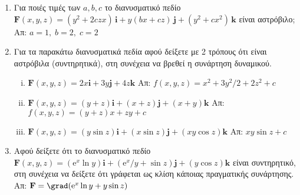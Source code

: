 




\pagestyle{askhseis}
\everymath{\displaystyle}



\begin{center}
  \minibox{\large\bfseries \textcolor{Col1}{Επικαμπύλιο Ολοκλήρωμα ΙΙου είδους}}
\end{center}

\vspace{\baselineskip}

\begin{enumerate}


  \section*{Ανεξαρτησία Διαδρομής}

  \item Για ποιές τιμές των $ a,b,c $ το διανυσματικό πεδίο $ \mathbf{F}(x,y,z) =
    (y^{2}+2czx)
    \,\mathbf{i} + y(bx+cz) \,\mathbf{j} + (y^{2}+cx^{2}) \,\mathbf{k} $ είναι 
    αστρόβιλο; \hfill Απ: $ a=1, \; b=2, \; c=2 $ 

  \item Για τα παρακάτω διανυσματικά πεδία αφού δείξετε με 2 τρόπους ότι είναι 
    αστρόβιλα (συντηρητικά), στη συνέχεια να βρεθεί η συνάρτηση δυναμικού.
    \begin{enumerate}[i)]
      \item $ \mathbf{F}(x,y,z) = 2x \mathbf{i} + 3y \mathbf{j} + 4z \mathbf{k}
        $ \hfill Απ: $ f(x,y,z) = x^{2}+ {3y^{2}}/{2} + 2z^{2} +c $ 
      \item $ \mathbf{F}(x,y,z) = (y+z) \mathbf{i} + (x+z) \mathbf{j} + (x+y) \mathbf{k}
        $ \hfill Απ: $ f(x,y,z) = (y+z)x+zy + c $ 
      \item $ \mathbf{F}(x,y,z) = (y \sin{z}) \mathbf{i} + (x \sin{z}) \mathbf{j} + (xy
        \cos{z}) \mathbf{k} $ \hfill Απ: $ xy \sin{z} + c $ 
    \end{enumerate}

  \item Αφού δείξετε ότι το διανυσματικό πεδίο $ \mathbf{F}(x,y,z) = (\mathrm{e}^{x}
    \ln{y}) \mathbf{i} +
    ({\mathrm{e}^{x}}/{y} + \sin{z}) \mathbf{j} + (y \cos{z}) \mathbf{k} $ 
    είναι συντηρητικό, στη συνέχεια να δείξετε ότι γράφεται ως κλίση κάποιας 
    πραγματικής συνάρτησης. \hfill Απ: $ \mathbf{F}= \grad (\mathrm{e}^{x} \ln{y} + y
    \sin{z}) $ 


\end{enumerate}
